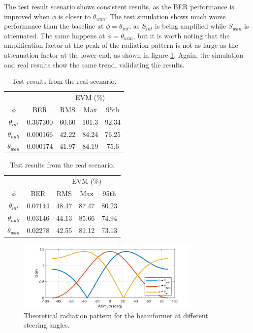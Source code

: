 \documentclass[12pt,a4paper]{report}
\begin{document}
The test result scenario shows consistent results, as the BER performance is improved when $\phi$ is closer to $\theta_{wan}$. The test simulation shows much worse performance than the baseline at $\phi = \theta_{int}$; as $S_{int}$ is being amplified while $S_{wan}$ is attenuated. The same happens at $\phi = \theta_{wan}$, but it is worth noting that the amplification factor at the peak of the radiation pattern is not as large as the attenuation factor at the lower end, as shown in figure \ref{fig:test:bf:rx:pattern}. Again, the simulation and real results show the same trend, validating the results. 

\begin{table}[h]
    \centering
    \parbox{.45\linewidth}{
    \centering
    \begin{tabular}{c|c|c|c|c}
    & & \multicolumn{3}{c}{EVM (\%)} \\ 
    $\phi$ & BER & RMS & Max & 95th \\ \hline
    $\theta_{int}$ & 0.367300 & 60.60 & 101.3 & 92.34 \\
    $\theta_{null}$   & 0.000166 & 42.22 & 84.24 & 76.25 \\
    $\theta_{wan}$  & 0.000174 & 41.97 & 84.19 & 75.6

    \end{tabular}
    \caption[Results of the simulated scenario for the RX beamformer.]{Test results from the simulated scenario.}
    \label{tab:test:bf:rx:test:sim}
    }
    \hfill
    \parbox{.45\linewidth}{
    \centering
    \begin{tabular}{c|c|c|c|c}
    & & \multicolumn{3}{c}{EVM (\%)} \\
    $\phi$ & BER & RMS & Max & 95th \\ \hline
    $\theta_{int}$ & 0.07144 & 48.47 & 87.47 & 80.23 \\ 
    $\theta_{null}$ & 0.03146 & 44.13 & 85.66 & 74.94 \\
    $\theta_{wan}$ & 0.02278 & 42.55 & 81.12 & 73.13
    \end{tabular}
    \caption[Results of the real scenario for the RX beamformer.]{Test results from the real scenario.}
    \label{tab:test:bf:rx:test:real}
    }
\end{table}

\begin{figure}[h]
    \centering
    \includegraphics[width = 0.8\textwidth]{Figures/test_bf_rx_pattern.png}
    \caption{Theoretical radiation pattern for the beamformer at different steering angles.}
    \label{fig:test:bf:rx:pattern}
\end{figure}
\end{document}
